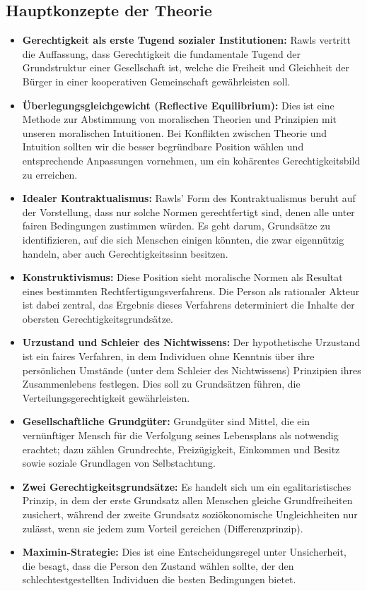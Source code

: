 \documentclass{article}
\begin{document}
\subsection*{Hauptkonzepte der Theorie}

\begin{itemize}
	\item \textbf{Gerechtigkeit als erste Tugend sozialer Institutionen:} Rawls vertritt die Auffassung, dass Gerechtigkeit die fundamentale Tugend der Grundstruktur einer Gesellschaft ist, welche die Freiheit und Gleichheit der Bürger in einer kooperativen Gemeinschaft gewährleisten soll.
	\item \textbf{Überlegungsgleichgewicht (Reflective Equilibrium):} Dies ist eine Methode zur Abstimmung von moralischen Theorien und Prinzipien mit unseren moralischen Intuitionen. Bei Konflikten zwischen Theorie und Intuition sollten wir die besser begründbare Position wählen und entsprechende Anpassungen vornehmen, um ein kohärentes Gerechtigkeitsbild zu erreichen.
	\item \textbf{Idealer Kontraktualismus:} Rawls' Form des Kontraktualismus beruht auf der Vorstellung, dass nur solche Normen gerechtfertigt sind, denen alle unter fairen Bedingungen zustimmen würden. Es geht darum, Grundsätze zu identifizieren, auf die sich Menschen einigen könnten, die zwar eigennützig handeln, aber auch Gerechtigkeitssinn besitzen.
	\item \textbf{Konstruktivismus:} Diese Position sieht moralische Normen als Resultat eines bestimmten Rechtfertigungsverfahrens. Die Person als rationaler Akteur ist dabei zentral, das Ergebnis dieses Verfahrens determiniert die Inhalte der obersten Gerechtigkeitsgrundsätze.
	\item \textbf{Urzustand und Schleier des Nichtwissens:} Der hypothetische Urzustand ist ein faires Verfahren, in dem Individuen ohne Kenntnis über ihre persönlichen Umstände (unter dem Schleier des Nichtwissens) Prinzipien ihres Zusammenlebens festlegen. Dies soll zu Grundsätzen führen, die Verteilungsgerechtigkeit gewährleisten.
	\item \textbf{Gesellschaftliche Grundgüter:} Grundgüter sind Mittel, die ein vernünftiger Mensch für die Verfolgung seines Lebensplans als notwendig erachtet; dazu zählen Grundrechte, Freizügigkeit, Einkommen und Besitz sowie soziale Grundlagen von Selbstachtung.
	\item \textbf{Zwei Gerechtigkeitsgrundsätze:} Es handelt sich um ein egalitaristisches Prinzip, in dem der erste Grundsatz allen Menschen gleiche Grundfreiheiten zusichert, während der zweite Grundsatz soziökonomische Ungleichheiten nur zulässt, wenn sie jedem zum Vorteil gereichen (Differenzprinzip).
	\item \textbf{Maximin-Strategie:} Dies ist eine Entscheidungsregel unter Unsicherheit, die besagt, dass die Person den Zustand wählen sollte, der den schlechtestgestellten Individuen die besten Bedingungen bietet.
\end{itemize}
\end{document}

